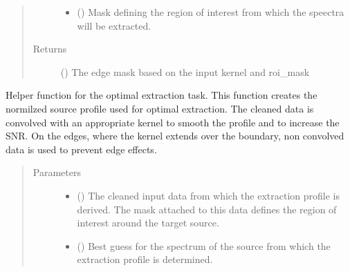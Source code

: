 \documentclass[a4paper,10pt,english]{sphinxmanual}
\begin{document}
\begin{fulllineitems}
\begin{fulllineitems}
\begin{quote}
\begin{description}
\begin{itemize}
\item {} 
 () \textendash{} Mask defining the region of interest from which the speectra will
be extracted.

\end{itemize}

\item[{Returns}] \leavevmode
{} () \textendash{} The edge mask based on the input kernel and roi\_mask

\end{description}\end{quote}

\end{fulllineitems}


\begin{fulllineitems}
\label{\detokenize{cascade.TSO:cascade.TSO.TSO.TSOSuite._create_extraction_profile}}
Helper function for the optimal extraction task.
This function creates the normilzed source profile used for optimal
extraction. The cleaned data is convolved with an appropriate kernel
to smooth the profile and to increase the SNR. On the edges, where the
kernel extends over the boundary, non convolved data is used to
prevent edge effects.
\begin{quote}\begin{description}
\item[{Parameters}] \leavevmode\begin{itemize}
\item {} 
 () \textendash{} The cleaned input data from which the extraction profile is
derived. The mask attached to this data defines the region of
interest around the target source.

\item {} 
 () \textendash{} Best guess for the spectrum of the source from which the extraction
profile is determined.


\end{itemize}
\end{description}
\end{quote}
\end{fulllineitems}
\end{fulllineitems}
\end{document}
